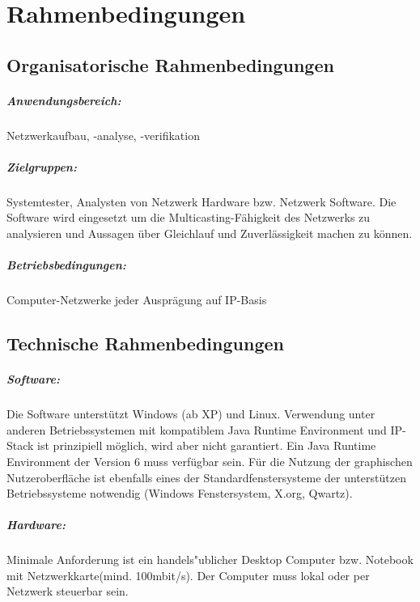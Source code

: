 
\chapter{Rahmenbedingungen}
\label{cha:rahm}

\section{Organisatorische Rahmenbedingungen}
\label{sec:orga}

\paragraph{Anwendungsbereich:} Netzwerkaufbau, -analyse, -verifikation

\paragraph{Zielgruppen:} Systemtester, Analysten von Netzwerk Hardware bzw.
Netzwerk Software. Die Software wird eingesetzt um die
Multicasting-Fähigkeit des Netzwerks zu analysieren und Aussagen über
Gleichlauf und Zuverlässigkeit machen zu können.

\paragraph{Betriebsbedingungen:} Computer-Netzwerke jeder Ausprägung auf
IP-Basis

\section{Technische Rahmenbedingungen}
\label{sec:tech}

\paragraph{Software:} Die Software unterstützt Windows (ab XP) und Linux. 
Verwendung unter anderen Betriebssystemen mit kompatiblem Java
Runtime Environment und IP-Stack ist prinzipiell möglich, wird aber nicht
garantiert. Ein Java Runtime Environment der Version 6 muss verfügbar sein. Für
die Nutzung der graphischen Nutzeroberfläche ist ebenfalls eines der
Standardfenstersysteme der unterstützen Betriebssysteme notwendig (Windows
Fenstersystem, X.org, Qwartz).

\paragraph{Hardware:} Minimale Anforderung ist ein handels"ublicher Desktop
Computer bzw. Notebook mit Netzwerkkarte(mind. 100mbit/s). Der Computer muss
lokal oder per Netzwerk steuerbar sein.

